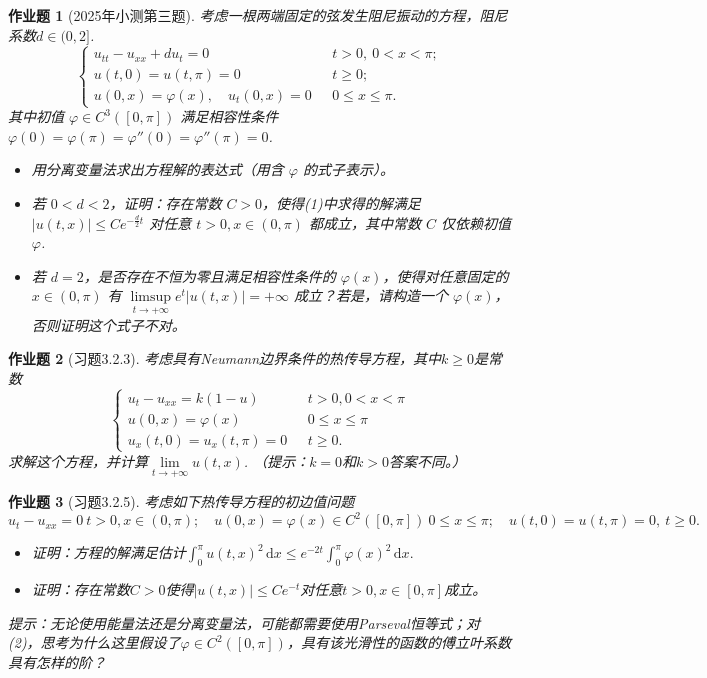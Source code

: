 \documentclass[UTF8,fontset=windows,12pt]{ctexart}
\theoremstyle{kaiti-theorem}
\newtheorem{problem}{作业题}
\numberwithin{equation}{section}
\newcommand{\vp}{\varphi}
\newcommand{\q}{\quad}
\newcommand{\dx}{\,\mathrm{d}x}
\begin{document}
\begin{problem}[2025年小测第三题]
考虑一根两端固定的弦发生阻尼振动的方程，阻尼系数$d\in(0,2]$.
\[
\begin{cases}
u_{tt}-u_{xx}+du_t=0&~~~t>0,~0<x<\pi;\\
u(t,0)=u(t,\pi)=0&~~~t\geqslant 0;\\
u(0,x)=\vp(x),\q u_t(0,x)=0&~~~0\leqslant x\leqslant\pi.
\end{cases}
\]其中初值 $\vp\in C^3([0,\pi])$ 满足相容性条件 $\vp(0)=\vp(\pi)=\vp''(0)=\vp''(\pi)=0$.
\begin{itemize}
    \item [(1)]  用分离变量法求出方程解的表达式（用含 $\vp$ 的式子表示）。
    \item [(2)]  若 $0<d<2$，证明：存在常数 $C>0$，使得(1)中求得的解满足 $|u(t,x)|\leqslant Ce^{-\frac{d}{2}t}$ 对任意 $t>0,x\in(0,\pi)$ 都成立，其中常数 $C$ 仅依赖初值 $\vp$.
    \item [(3)] 若 $d=2$，是否存在不恒为零且满足相容性条件的 $\vp(x)$，使得对任意固定的 $x\in(0,\pi)$ 有 $\limsup\limits_{t\to+\infty} e^{t}|u(t,x)|=+\infty$ 成立？若是，请构造一个 $\vp(x)$，否则证明这个式子不对。
\end{itemize}
\end{problem}


\begin{problem}[习题3.2.3]
考虑具有Neumann边界条件的热传导方程，其中$k\geq0$是常数
\[
\begin{cases}
u_{t}-u_{xx}=k(1-u)&~~~t>0,0<x<\pi\\
u(0,x)=\varphi(x)&~~~0\leqslant x\leqslant \pi\\
u_x(t,0)=u_x(t,\pi)=0&~~~t\geqslant 0.
\end{cases}
\]求解这个方程，并计算$\lim\limits_{t\to+\infty} u(t,x)$. （提示：$k=0$和$k>0$答案不同。）
\end{problem}


\begin{problem}[习题3.2.5]
考虑如下热传导方程的初边值问题
\[
u_t-u_{xx}=0~t>0,x\in(0,\pi);\q u(0,x)=\vp(x)\in C^2([0,\pi])~0\leqslant x\leqslant \pi;\q u(t,0)=u(t,\pi)=0,~t\geqslant 0.
\]
\begin{itemize}
\item [(1)] 证明：方程的解满足估计$\int_0^\pi u(t,x)^2\dx\leqslant e^{-2t}\int_0^\pi \vp(x)^2\dx.$
\item [(2)] 证明：存在常数$C>0$使得$|u(t,x)|\leqslant Ce^{-t}$对任意$t>0,x\in[0,\pi]$成立。
\end{itemize}
提示：无论使用能量法还是分离变量法，可能都需要使用Parseval恒等式；对(2)，思考为什么这里假设了$\vp\in C^2([0,\pi])$，具有该光滑性的函数的傅立叶系数具有怎样的阶？
\end{problem}
\end{document}
